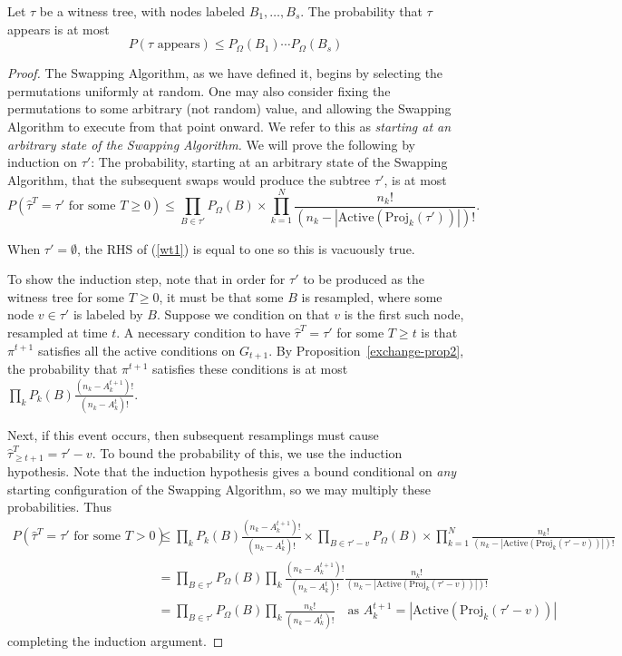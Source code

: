 {
\renewcommand{\thetheorem}{\ref{witness-tree-lemma}}
\begin{lemma}
Let $\tau$ be a witness tree, with nodes labeled $B_1, \dots, B_s$. The probability that $\tau$ appears is at most
$$
P(\text{$\tau$  appears}) \leq P_{\Omega}(B_1) \cdots P_{\Omega}(B_s)
$$
\end{lemma}
\addtocounter{theorem}{-1}
}
\begin{proof}
The Swapping Algorithm, as we have defined it, begins by selecting the permutations uniformly at random. One may also consider fixing the permutations to some arbitrary (not random) value, and allowing the Swapping Algorithm to execute from that point onward. We refer to this as \emph{starting at an arbitrary state of the Swapping Algorithm.} We will prove the following by induction on $\tau'$: The probability, starting at an arbitrary state of the Swapping Algorithm, that the subsequent swaps would produce the subtree $\tau'$, is at most 
\begin{equation}
\label{wt1}
P(\text{$\hat \tau^T = \tau'$ for some $T \geq 0$}) \leq \prod_{B \in \tau'} P_{\Omega}(B) \times \prod_{k=1}^N \frac{n_k!}{(n_k - |\text{Active}( \text{Proj}_{k}(\tau'))|)!}. 
\end{equation}

When $\tau' = \emptyset$, the RHS of (\ref{wt1}) is equal to one so this is vacuously true.

To show the induction step, note that in order for $\tau'$ to be produced as the witness tree for some $T \geq 0$, it must be that some $B$ is resampled, where some node $v \in \tau'$ is labeled by $B$. Suppose we condition on that $v$ is the first such node, resampled at time $t$. A necessary condition to have $\hat \tau^T = \tau'$ for some $T \geq t$ is that $\pi^{t+1}$ satisfies all the active conditions on $G_{t+1}$. By Proposition~\ref{exchange-prop2}, the probability that $\pi^{t+1}$ satisfies these conditions is at most  $\prod_k P_k(B) \frac{ (n_k - A_k^{t+1})!}{(n_k - A_k^t)!}$.

Next, if this event occurs, then subsequent resamplings must cause $\hat \tau_{\geq t+1}^{T} =  \tau' - v$. To bound the probability of this, we use the induction hypothesis. Note that the induction hypothesis gives a bound conditional on \emph{any} starting configuration of the Swapping Algorithm, so we may multiply these probabilities. Thus
\begin{align*}
P(\text{$\hat \tau^T = \tau'$ for some $T > 0$}) &\leq \prod_k P_k(B) \frac{ (n_k - A_k^{t+1})!}{(n_k - A_k^t)!} \times  \prod_{B \in \tau' - v} P_{\Omega}(B) \times \prod_{k=1}^N \frac{n_k!}{(n_k - |\text{Active}( \text{Proj}_{k}(\tau' - v))|)!} \\
&= \prod_{B \in \tau'} P_{\Omega}(B) \prod_k \frac{ (n_k - A_k^{t+1})!}{(n_k - A_k^t)!} \frac{n_k!}{(n_k - |\text{Active}( \text{Proj}_{k}(\tau' - v))|)!} \\
&= \prod_{B \in \tau'} P_{\Omega}(B) \prod_k \frac{n_k!}{(n_k - A_k^t)!} \quad \text{as $A_k^{t+1} = |\text{Active}( \text{Proj}_{k}(\tau' - v))|$} 
\end{align*}
completing the induction argument.


\end{proof}
